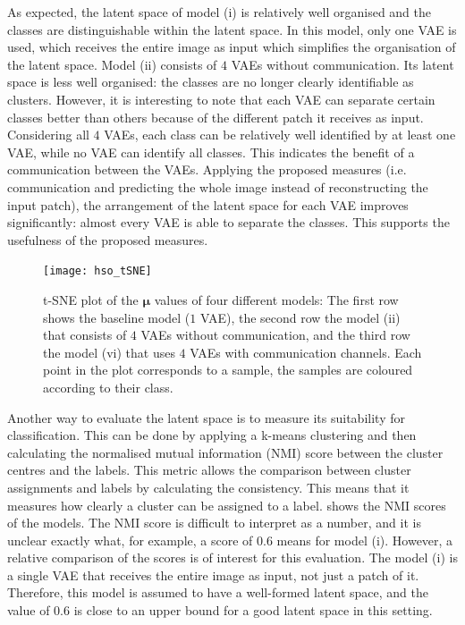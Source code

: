 As expected, the latent space of model (i) is relatively well organised and the classes are distinguishable within the latent space. In this model, only one VAE is used, which receives the entire image as input which simplifies the organisation of the latent space. Model (ii) consists of $4$ VAEs without communication. Its latent space is less well organised: the classes are no longer clearly identifiable as clusters. However, it is interesting to note that each VAE can separate certain classes better than others because of the different patch it receives as input. Considering all $4$ VAEs, each class can be relatively well identified by at least one VAE, while no VAE can identify all classes. This indicates the benefit of a communication between the VAEs.
Applying the proposed measures (i.e. communication and predicting the whole image instead of reconstructing the input patch), the arrangement of the latent space for each VAE improves significantly: almost every VAE is able to separate the classes. This supports the usefulness of the proposed measures.

\begin{figure}[h]
    \centering
    \texttt{[image: hso\_tSNE]}
    \caption[t-SNE plot of the $\boldsymbol{\mu}$ values of different models]{t-SNE plot of the $\boldsymbol{\mu}$ values of four different models: The first row shows the baseline model ($1$ VAE), the second row the model (ii) that consists of $4$ VAEs without communication, and the third row the model (vi) that uses $4$ VAEs with communication channels. Each point in the plot corresponds to a sample, the samples are coloured according to their class.}
\end{figure}


Another way to evaluate the latent space is to measure its suitability for classification. This can be done by applying a k-means clustering and then calculating the normalised mutual information (NMI) score between the cluster centres and the labels. This metric allows the comparison between cluster assignments and labels by calculating the consistency. This means that it measures how clearly a cluster can be assigned to a label.  shows the NMI scores of the models.
The NMI score is difficult to interpret as a number, and it is unclear exactly what, for example, a score of $0.6$ means for model (i). However, a relative comparison of the scores is of interest for this evaluation. The model (i) is a single VAE that receives the entire image as input, not just a patch of it. Therefore, this model is assumed to have a well-formed latent space, and the value of $0.6$ is close to an upper bound for a good latent space in this setting.

